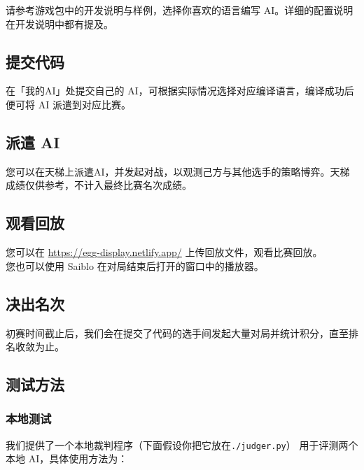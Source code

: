 \documentclass[UTF8]{article}
\begin{document}
请参考游戏包中的开发说明与样例，选择你喜欢的语言编写
AI。详细的配置说明在开发说明中都有提及。

\hypertarget{header-n41}{%
\subsection{提交代码}\label{header-n41}}

在「我的AI」处提交自己的
AI，可根据实际情况选择对应编译语言，编译成功后便可将 AI 派遣到对应比赛。

\hypertarget{header-n43}{%
\subsection{派遣 AI}\label{header-n43}}

您可以在天梯上派遣AI，并发起对战，以观测己方与其他选手的策略博弈。天梯成绩仅供参考，不计入最终比赛名次成绩。

\hypertarget{header-n45}{%
\subsection{观看回放}\label{header-n45}}

您可以在 \url{https://egg-display.netlify.app/} 上传回放文件，观看比赛回放。\\
您也可以使用 Saiblo 在对局结束后打开的窗口中的播放器。

\hypertarget{header-n47}{%
\subsection{决出名次}\label{header-n47}}

初赛时间截止后，我们会在提交了代码的选手间发起大量对局并统计积分，直至排名收敛为止。

\hypertarget{header-n49}{%
\subsection{测试方法}\label{header-n49}}

\hypertarget{header-n50}{%
\subsubsection{本地测试}\label{header-n50}}

我们提供了一个本地裁判程序（下面假设你把它放在\texttt{./judger.py}）
用于评测两个本地 AI，具体使用方法为：
\end{document}
